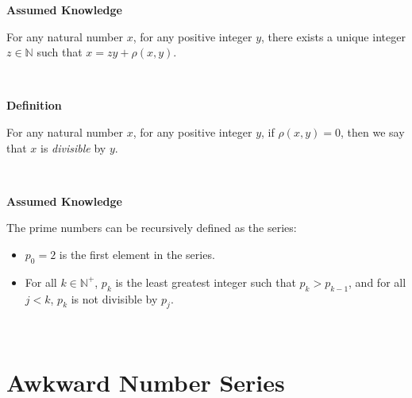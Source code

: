\documentclass[a4paper,12pt]{article}
\begin{document}
\label{assumed_knowledge:divisibility_uniqueness}
\hypertarget{assumed_knowledge:divisibility_uniqueness}{}
\begin{tcolorbox}
\textbf{Assumed Knowledge}

\noindent For any natural number $x$, for any positive integer $y$, there exists a unique integer $z \in \mathbb{N}$ such that $x = zy + \rho(x, y)$. 
\end{tcolorbox}
\noindent \\







\label{definition:divisibility}
\hypertarget{definition:divisibility}{}
\begin{tcolorbox}
\textbf{Definition}

\noindent For any natural number $x$, for any positive integer $y$, if $\rho(x,y) = 0$, then we say that $x$ is \textit{divisible} by $y$.
\end{tcolorbox}
\noindent \\







\label{assumed_knowledge:recursive_prime_definition}
\hypertarget{assumed_knowledge:recursive_prime_definition}{}
\begin{tcolorbox}
\textbf{Assumed Knowledge}

\noindent The prime numbers can be recursively defined as the series:

\begin{itemize}

\item $p_0 = 2$ is the first element in the series.

\item For all $k \in \mathbb{N}^+$, $p_k$ is the least greatest integer such that $p_k > p_{k-1}$, and for all $j < k$, $p_k$ is not divisible by $p_j$.

\end{itemize}
\end{tcolorbox}
\noindent \\




\section{Awkward Number Series}
\label{section:awkward_number_series}
\end{document}
